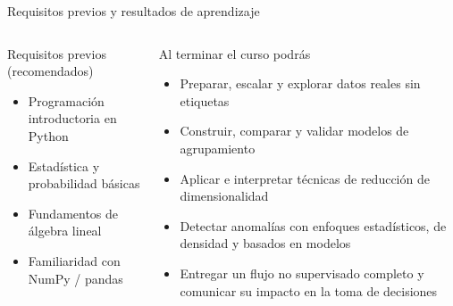 \documentclass[aspectratio=169,11pt]{beamer}
\begin{document}
\begin{frame}{Requisitos previos y resultados de aprendizaje}
  \begin{columns}[T]
    \begin{block}{Requisitos previos (recomendados)}
      \begin{itemize}
        \item Programación introductoria en Python
        \item Estadística y probabilidad básicas
        \item Fundamentos de álgebra lineal
        \item Familiaridad con NumPy / pandas
      \end{itemize}
    \end{block}
    \begin{exampleblock}{Al terminar el curso podrás}
      \begin{itemize}
        \item Preparar, escalar y explorar datos reales sin etiquetas
        \item Construir, comparar y validar modelos de agrupamiento
        \item Aplicar e interpretar técnicas de reducción de dimensionalidad
        \item Detectar anomalías con enfoques estadísticos, de densidad y basados en modelos
        \item Entregar un flujo no supervisado completo y comunicar su impacto en la toma de decisiones
      \end{itemize}
    \end{exampleblock}
  \end{columns}
\end{frame}
\end{document}
